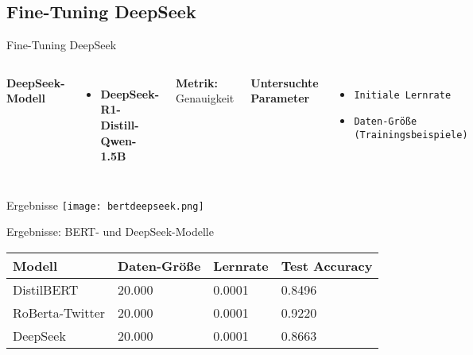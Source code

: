 \documentclass[aspectratio=169]{beamer} %
\begin{document}
\subsection{Fine-Tuning DeepSeek}
\begin{frame}{Fine-Tuning DeepSeek}
  \fontsize{10pt}{12pt}\selectfont
  \vspace{0.3cm}

  \begin{columns}
      \textbf{DeepSeek-Modell}
      \vspace{0.3cm}
      \begin{itemize}
          \item \textbf{DeepSeek-R1-Distill-Qwen-1.5B}
      \end{itemize}
      \vspace{0.5cm}
      \textbf{Metrik:} Genauigkeit
      \vspace{-0.6cm}

      \textbf{Untersuchte Parameter}
      \vspace{0.3cm}
      \begin{itemize}
          \item \texttt{Initiale Lernrate}
          \item \texttt{Daten-Größe (Trainingsbeispiele)}
      \end{itemize}
  \end{columns}
\end{frame}

\begin{frame}{Ergebnisse}
    \centering
    \texttt{[image: bertdeepseek.png]}
\end{frame}

\begin{frame}{Ergebnisse: BERT- und DeepSeek-Modelle}
    \centering
    \scriptsize
    \begin{tabular}{|l|l|l|l|}
        \hline
        \textbf{Modell} & \textbf{Daten-Größe} & \textbf{Lernrate} & \textbf{Test Accuracy} \\
        \hline
        DistilBERT & 20.000 & 0.0001 & 0.8496 \\
        RoBerta-Twitter & 20.000 & 0.0001 & 0.9220 \\
        DeepSeek & 20.000 & 0.0001 & 0.8663 \\
        \hline
    \end{tabular}
\end{frame}
\end{document}
